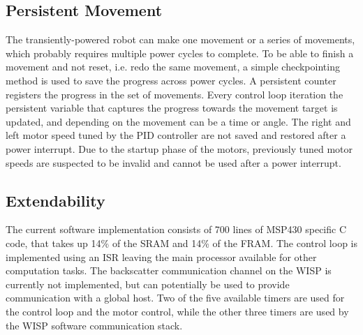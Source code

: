 
\subsection{Persistent Movement}
The transiently-powered robot can make one movement or a series of movements, which probably requires multiple power cycles to complete.
To be able to finish a movement and not reset, i.e. redo the same movement, a simple checkpointing method is used to save the progress across power cycles.
A persistent counter registers the progress in the set of movements.
Every control loop iteration the persistent variable that captures the progress towards the movement target is updated, and depending on the movement can be a time or angle.
The right and left motor speed tuned by the PID controller are not saved and restored after a power interrupt.
Due to the startup phase of the motors, previously tuned motor speeds are suspected to be invalid and cannot be used after a power interrupt. 

\subsection{Extendability}
The current software implementation consists of 700 lines of MSP430 specific C code, that takes up 14\% of the SRAM and 14\% of the FRAM.
The control loop is implemented using an ISR leaving the main processor available for other computation tasks.
The backscatter communication channel on the WISP is currently not implemented, but can potentially be used to provide communication with a global host. 
Two of the five available timers are used for the control loop and the motor control, while the other three timers are used by the WISP software communication stack.